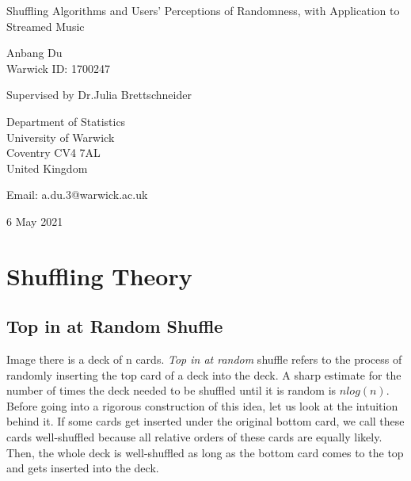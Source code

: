 \documentclass[12pt]{article}
\theoremstyle{plain}
\theoremstyle{definition}
\theoremstyle{remark}
\begin{document}
\thispagestyle{empty}
\begin{center}
{\Huge Shuffling Algorithms and Users’ Perceptions of Randomness, with Application to Streamed Music

\bigskip
\bigskip


\bigskip
\bigskip

\huge Anbang Du\\
\vspace{5pt}
\huge Warwick ID: 1700247\\
\bigskip
\bigskip
\bigskip


\LARGE Supervised by Dr.Julia Brettschneider}
\end{center}
\vfill

\begin{center}
{\Large
Department of Statistics\\
University of Warwick\\
Coventry CV4 7AL\\
United Kingdom\\
\medskip

Email: a.du.3@warwick.ac.uk \\
\medskip

6 May 2021 }
\end{center}
\bigskip

\newpage




\tableofcontents

\clearpage


\section{Shuffling Theory}
\subsection{Top in at Random Shuffle}

Image there is a deck of n cards. \textit{Top in at random}\cite[Example~1 on \pno~333]{1.1} shuffle refers to the process of randomly inserting the top card of a deck into the deck. A sharp estimate for the number of times the deck needed to be shuffled until it is random is $nlog(n)$. Before going into a rigorous construction of this idea, let us look at the intuition behind it. If some cards get inserted under the original bottom card, we call these cards well-shuffled because all relative orders of these cards are equally likely. Then, the whole deck is well-shuffled as long as the bottom card comes to the top and gets inserted into the deck. 
\end{document}
